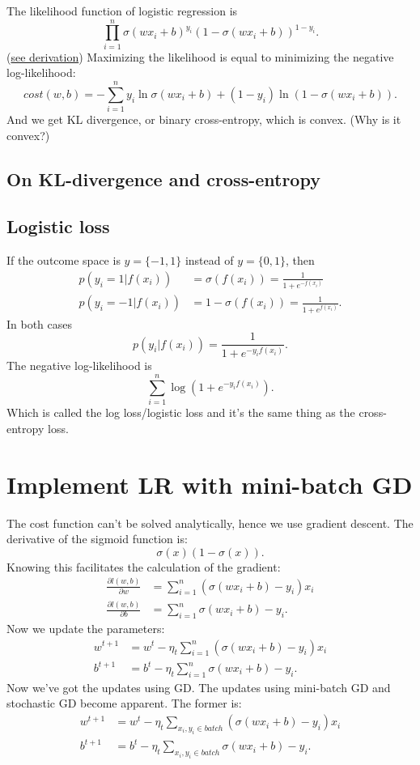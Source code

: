 \documentclass{report}
\begin{document}
The likelihood function of logistic regression is 
\begin{displaymath}
\prod_{i=1}^{n} {\sigma\left( wx_{i} + b \right)^{y_{i}}\left( 1 - \sigma\left( wx_{i} + b\right)\right)^{1 - y_{i} }}.
\end{displaymath} (\href{https://zstevenwu.com/courses/s20/csci5525/resources/slides/lecture05.pdf}{see derivation})
Maximizing the likelihood is equal to minimizing the negative log-likelihood: \[
	cost\left( w, b \right) = -\sum_{i=1}^{n} y_{i} \ln \sigma \left(wx_{i} + b\right) + \left( 1 - y_{i} \right) \ln \left(1 - \sigma\left(wx_{i} + b\right)\right)
.\] 
And we get KL divergence, or binary cross-entropy, which is convex. (Why is it convex?)

\subsection{On KL-divergence and cross-entropy}
\subsection{Logistic loss}
If the outcome space is $y=\{-1, 1\}$ instead of  $y=\{0, 1\}$, then
\begin{align*}
	p(y_i = 1 | f(x_i)) &= \sigma(f(x_i)) = \frac{1}{1 + e^{-f(x_i)}} \\
	p(y_i = -1 | f(x_i)) &= 1 - \sigma(f(x_i)) = \frac{1}{1 + e^{f(x_i)}}
.\end{align*}
In both cases \[
	p(y_i | f(x_i)) = \frac{1}{1 + e^{-y_if(x_i)}}
.\]  
The negative log-likelihood is \[
	\sum_{i=1}^{n} \log(1 + e^{-y_if(x_i)})
.\] 
Which is called the log loss/logistic loss and it's the same thing as the cross-entropy loss.

  \section{Implement LR with mini-batch GD}The cost function can't be solved analytically, hence we use gradient descent.
  The derivative of the sigmoid function is:
  \[
  \sigma(x)(1 - \sigma(x))
  .\] 
  Knowing this facilitates the calculation of the gradient: 
  \begin{align*}
	  \frac{\partial l(w, b)}{\partial w} & = \sum_{i = 1}^{n} (\sigma(wx_i + b) - y_i) x_i \\
\frac{\partial l(w, b)}{\partial b} & = \sum_{i = 1}^{n} \sigma(wx_i + b) - y_i. 
  \end{align*}
  Now we update the parameters:
  \begin{align*}
    w^{t+1} &= w^t - \eta_t \sum_{i=1}^{n} (\sigma(wx_i + b) - y_i) x_i \\
    b^{t+1} &= b^t - \eta_t \sum_{i=1}^{n} \sigma(wx_i + b) - y_i
  .\end{align*}
Now we've got the updates using GD. The updates using mini-batch GD and stochastic GD become apparent. The former is:
  \begin{align*}
    w^{t+1} &= w^t - \eta_t \sum_{x_i, y_i \in batch}(\sigma(wx_i + b) - y_i) x_i \\
    b^{t+1} &= b^t - \eta_t \sum_{x_i, y_i \in batch}\sigma(wx_i + b) - y_i
  .\end{align*}
\end{document}
